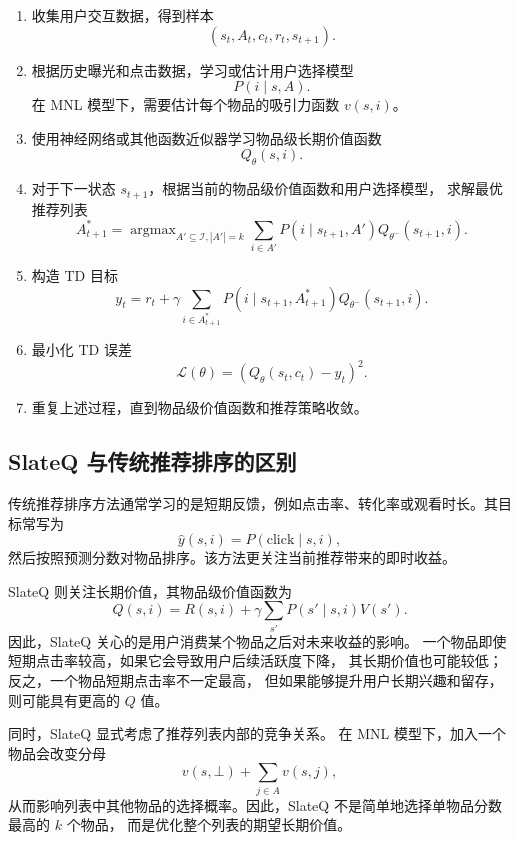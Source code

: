 \documentclass[11pt]{ctexart}
\begin{document}
\begin{enumerate}
    \item 收集用户交互数据，得到样本
    \[
    (s_t,A_t,c_t,r_t,s_{t+1}).
    \]

    \item 根据历史曝光和点击数据，学习或估计用户选择模型
    \[
    P(i\mid s,A).
    \]
    在 MNL 模型下，需要估计每个物品的吸引力函数 $v(s,i)$。

    \item 使用神经网络或其他函数近似器学习物品级长期价值函数
    \[
    Q_{\theta}(s,i).
    \]

    \item 对于下一状态 $s_{t+1}$，根据当前的物品级价值函数和用户选择模型，
    求解最优推荐列表
    \[
    A_{t+1}^{*}
    =
    \mathop{\arg\max}_{A'\subseteq \mathcal{I}, |A'|=k}
    \sum_{i\in A'}P(i\mid s_{t+1},A')Q_{\theta^{-}}(s_{t+1},i).
    \]

    \item 构造 TD 目标
    \[
    y_t
    =
    r_t+
    \gamma
    \sum_{i\in A_{t+1}^{*}}
    P(i\mid s_{t+1},A_{t+1}^{*})
    Q_{\theta^{-}}(s_{t+1},i).
    \]

    \item 最小化 TD 误差
    \[
    \mathcal{L}(\theta)
    =
    \left(
    Q_{\theta}(s_t,c_t)-y_t
    \right)^2.
    \]

    \item 重复上述过程，直到物品级价值函数和推荐策略收敛。
\end{enumerate}

\subsection{SlateQ 与传统推荐排序的区别}

传统推荐排序方法通常学习的是短期反馈，例如点击率、转化率或观看时长。其目标常写为
\[
\hat{y}(s,i)=P(\text{click}\mid s,i),
\]
然后按照预测分数对物品排序。该方法更关注当前推荐带来的即时收益。

SlateQ 则关注长期价值，其物品级价值函数为
\[
Q(s,i)
=
R(s,i)
+
\gamma
\sum_{s'}P(s'\mid s,i)V(s').
\]
因此，SlateQ 关心的是用户消费某个物品之后对未来收益的影响。
一个物品即使短期点击率较高，如果它会导致用户后续活跃度下降，
其长期价值也可能较低；反之，一个物品短期点击率不一定最高，
但如果能够提升用户长期兴趣和留存，则可能具有更高的 $Q$ 值。

同时，SlateQ 显式考虑了推荐列表内部的竞争关系。
在 MNL 模型下，加入一个物品会改变分母
\[
v(s,\bot)+\sum_{j\in A}v(s,j),
\]
从而影响列表中其他物品的选择概率。因此，SlateQ 不是简单地选择单物品分数最高的 $k$ 个物品，
而是优化整个列表的期望长期价值。
\end{document}
